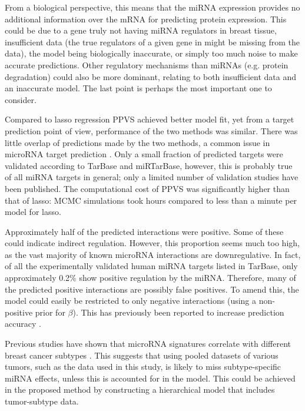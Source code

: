 From a biological perspective, this means that the miRNA expression provides
no additional information over the mRNA for predicting protein expression.
This could be due to a gene truly not having miRNA regulators in breast
tissue, insufficient data (the true regulators of a given gene in might be
missing from the data), the model being biologically inaccurate, or simply too
much noise to make accurate predictions. Other regulatory mechanisms than miRNAs
(e.g. protein degradation) could also be more dominant, relating to both
insufficient data and an inaccurate model. The last point is perhaps the most
important one to consider.


Compared to lasso regression PPVS achieved better model fit, yet from a target
prediction point of view, performance of the two methods was similar. There
was little overlap of predictions made by the two methods, a common issue in
microRNA target prediction \citep{vanIterson2013}. Only a small fraction of
predicted targets were validated according to TarBase and miRTarBase, however,
this is probably true of all miRNA targets in general; only a
limited number of validation studies have been published. The computational cost
of PPVS was significantly higher than that of lasso: MCMC simulations took hours
compared to less than a minute per model for lasso.

Approximately half of the predicted interactions were positive. Some of these
could indicate indirect regulation. However, this proportion seems much too
high, as the vast majority of known microRNA interactions are downregulative. In
fact, of all the experimentally validated human miRNA targets listed in
TarBase, only approximately 0.2\% show positive regulation by the miRNA.
Therefore, many of the predicted positive interactions are possibly false
positives. To amend this, the model could easily be restricted to only
negative interactions (using a non-positive prior for $\beta$). This has
previously been reported to increase prediction accuracy
\citep{Muniategui2013}.

Previous studies have shown that microRNA signatures correlate
with different breast cancer subtypes \citep{Blenkiron2007}. This suggests that
using pooled datasets of various tumors, such as the data used in this
study, is likely to miss subtype-specific miRNA effects, unless this is accounted
for in the model. This could be achieved in the proposed method by
constructing a hierarchical model that includes tumor-subtype data.

